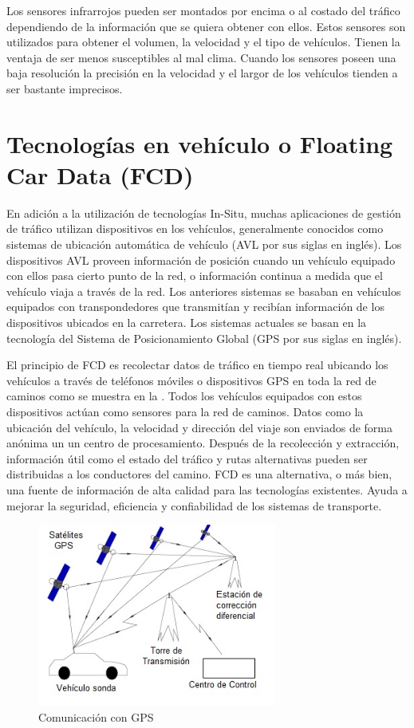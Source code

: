 Los sensores infrarrojos pueden ser montados por encima o al costado del tráfico dependiendo de la información que se quiera obtener con ellos. Estos sensores son utilizados para obtener el volumen, la velocidad y el tipo de vehículos. Tienen la ventaja de ser menos susceptibles al mal clima. Cuando los sensores poseen una baja resolución la precisión en la velocidad y el largor de los vehículos tienden a ser bastante imprecisos.

\section{Tecnologías en vehículo o Floating Car Data (FCD)}

En adición a la utilización de tecnologías In-Situ, muchas aplicaciones de gestión de tráfico utilizan dispositivos en los vehículos, generalmente conocidos como sistemas de ubicación automática de vehículo (AVL por sus siglas en inglés). Los dispositivos AVL proveen información de posición cuando un vehículo equipado con ellos pasa cierto punto de la red, o información continua a medida que el vehículo viaja a través de la red. Los anteriores sistemas se basaban en vehículos equipados con transpondedores que transmitían y recibían información de los dispositivos ubicados en la carretera. Los sistemas actuales se basan en la tecnología del Sistema de Posicionamiento Global (GPS por sus siglas en inglés).

El principio de FCD es recolectar datos de tráfico en tiempo real ubicando los vehículos a través de teléfonos móviles o dispositivos GPS en toda la red de caminos como se muestra en la . Todos los vehículos equipados con estos dispositivos actúan como sensores para la red de caminos. Datos como la ubicación del vehículo, la velocidad y dirección del viaje son enviados de forma anónima un un centro de procesamiento. Después de la recolección y extracción, información útil como el estado del tráfico y rutas alternativas pueden ser distribuidas a los conductores del camino. FCD es una alternativa, o más bien, una fuente de información de alta calidad para las tecnologías existentes. Ayuda a mejorar la seguridad, eficiencia y confiabilidad de los sistemas de transporte.

\begin{figure}[h]
	\centering
	\includegraphics[width=0.7\textwidth]{capitulos/3/figuras/figura4.jpg}
	\caption{\label{fig:ComunicacionGPS}  Comunicación con GPS}	
\end{figure}

